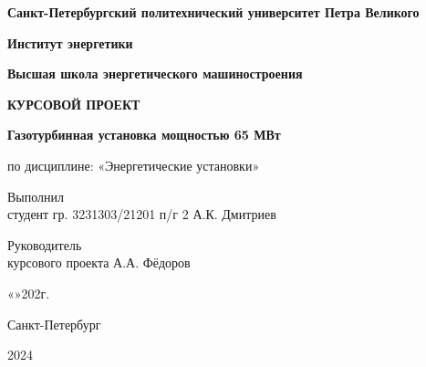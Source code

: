 \begin{titlepage}
  \begin{center}
    \textbf{Санкт-Петербургский политехнический университет Петра Великого}

    \textbf{Институт энергетики}

    \textbf{Высшая школа энергетического машиностроения}
  \end{center}

  \vspace{3cm}

  \begin{center}
    \begin{large}
      \textbf{КУРСОВОЙ ПРОЕКТ}
    \end{large}

    \vspace{1cm}
    \textbf{Газотурбинная установка мощностью 65 МВт}

    по дисциплине: «Энергетические установки»
  \end{center}

  \vspace{3cm}

  \begin{flushleft}
    Выполнил\\ студент гр. 3231303/21201 п/г 2 \hrulefill А.К. Дмитриев

    \vspace{0.5cm}

    Руководитель\\ курсового проекта \hrulefill А.А. Фёдоров
  \end{flushleft}

  \begin{flushright}
    «\underline{\hspace{0.5cm}}»\underline{\hspace{3cm}}202\underline{\hspace{0.5cm}}г.
  \end{flushright}


  \vfill
  \begin{center}
    Санкт-Петербург

    2024
  \end{center}
\end{titlepage}
